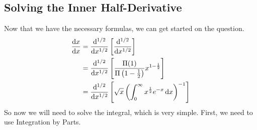 \documentclass[a4paper, twoside]{article}
\begin{document}
\subsection{Solving the Inner Half-Derivative}
Now that we have the necessary formulas, we can get started on the question.
\begin{align*}
    \frac{\text{d} x}{\text{d} x}&=\frac{\mathrm{d}^{1/2}}{\mathrm{d} {x}^{1/2}}\left[\frac{\mathrm{d}^{1/2}}{\mathrm{d} {x}^{1/2}}\right]\\
    &=\frac{\mathrm{d}^{1/2}}{\mathrm{d} {x}^{1/2}}\left[\frac{\Pi(1)}{\Pi\left(1-\frac{1}{2}\right)}x^{1-\frac{1}{2}}\right]\\
    &=\frac{\mathrm{d}^{1/2}}{\mathrm{d} {x}^{1/2}}\left[\sqrt{x}\left(\int_{0}^{\infty}{x^{\frac{1}{2}}e^{-x}\,\text{d} x}\right)^{-1}\right]
\end{align*}
So now we will need to solve the integral, which is very simple. First, we need to use Integration by Parts.
\end{document}
